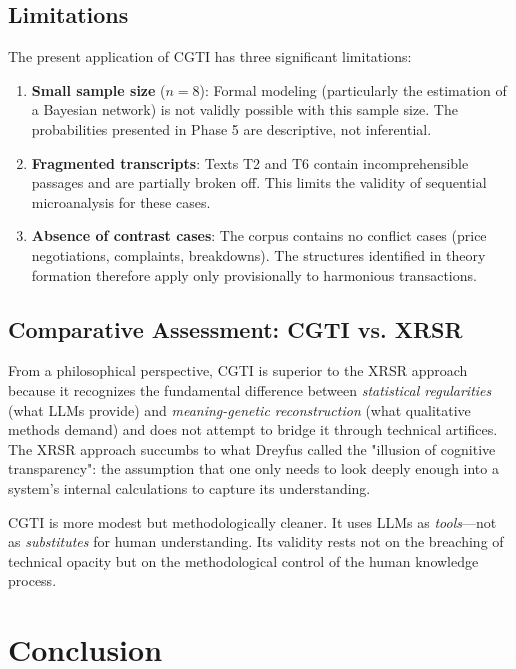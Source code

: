 \documentclass[12pt,a4paper]{article}
\begin{document}
\subsection{Limitations}

The present application of CGTI has three significant limitations:

\begin{enumerate}
    \item \textbf{Small sample size} ($n=8$): Formal modeling (particularly the estimation of a Bayesian network) is not validly possible with this sample size. The probabilities presented in Phase 5 are descriptive, not inferential.
    
    \item \textbf{Fragmented transcripts}: Texts T2 and T6 contain incomprehensible passages and are partially broken off. This limits the validity of sequential microanalysis for these cases.
    
    \item \textbf{Absence of contrast cases}: The corpus contains no conflict cases (price negotiations, complaints, breakdowns). The structures identified in theory formation therefore apply only provisionally to harmonious transactions.
\end{enumerate}

\subsection{Comparative Assessment: CGTI vs. XRSR}

From a philosophical perspective, CGTI is superior to the XRSR approach because it recognizes the fundamental difference between \textit{statistical regularities} (what LLMs provide) and \textit{meaning-genetic reconstruction} (what qualitative methods demand) and does not attempt to bridge it through technical artifices. The XRSR approach succumbs to what Dreyfus \cite{dreyfus1972what} called the "illusion of cognitive transparency": the assumption that one only needs to look deeply enough into a system's internal calculations to capture its understanding.

CGTI is more modest but methodologically cleaner. It uses LLMs as \textit{tools}—not as \textit{substitutes} for human understanding. Its validity rests not on the breaching of technical opacity but on the methodological control of the human knowledge process.

\section{Conclusion}
\end{document}
